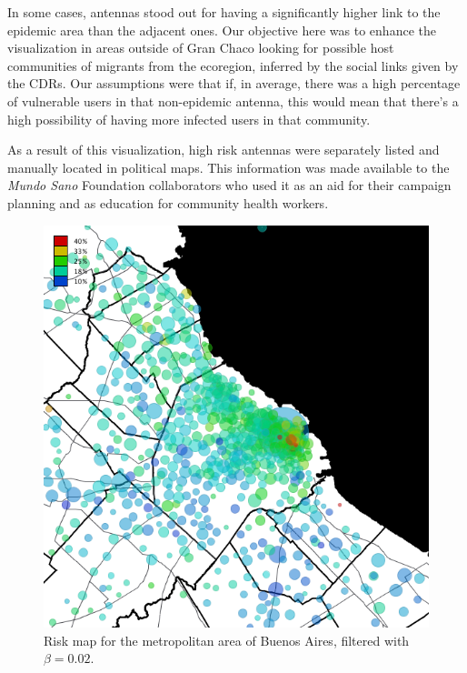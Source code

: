 In some cases, antennas stood out for having a significantly higher link to the epidemic area than the adjacent ones.
Our objective here was to enhance the visualization in areas outside of Gran Chaco looking for possible host communities of migrants from the ecoregion, inferred by the social links given by the CDRs.
Our assumptions were that if, in average, there was a high percentage of vulnerable users in that non-epidemic antenna, this would mean that there's a high possibility of having more infected users in that community.

As a result of this visualization, high risk antennas were separately listed and manually located in political maps.
This information was made available to the \textit{Mundo Sano} Foundation collaborators who used it as an aid for their campaign planning and as education for community health workers.


\begin{figure}[p]
	\caption{Risk map for the metropolitan area of Buenos Aires, filtered with $\beta = 0.02$.}\label{fig:amba_map}
	\centering
	\includegraphics[width=0.65\linewidth]
	{figures/201112_hi_res_amba_usuarios_proporcion_circulos_beta2/201112_hi_res_amba_usuarios_proporcion_circulos_beta2}
\end{figure}

